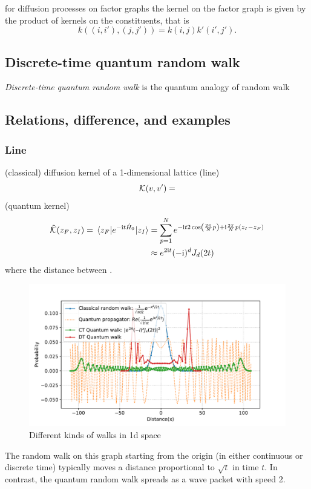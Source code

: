 \begin{remark}
	for diﬀusion processes on factor graphs the kernel on the factor graph is given by the product of kernels on the constituents, that is 
	\begin{equation}
		k((i, i'), (j, j')) = k(i, j) k' (i' , j' ).
	\end{equation}
\end{remark}

\subsection{Discrete-time quantum random walk}
\emph{Discrete-time quantum random walk} is the quantum analogy of random walk

\subsection{Relations, difference, and examples}
\subsubsection{Line}
(classical) diffusion kernel of a 1-dimensional lattice (line)
\begin{equation}
	\mathcal{K}(v,v') = 
\end{equation}
 (quantum kernel)
\begin{align}
	\tilde{\mathcal{K}}(z_F,z_I) = 
	\mel{z_F}{e^{-\textup{i}t\hat{H}_0 }}{z_I}
	&=\sum_{p=1}^{N} 
	e^{-\textup{i} t 2\cos(\frac{2\pi}{N}p) +\textup{i} \frac{2\pi}{N} p(z_I-z_F)} 
	\\
	&
	\approx e^{2\textup{i} t} (-\textup{i})^{d} J_{d} (2t)
	\label{eq:ctqrw_kernel}
\end{align}
where the distance between .
\begin{figure}[!ht]
	\centering
	\includegraphics[width=.7\linewidth]{walk_propagator_1d.pdf}
	\caption{Different kinds of walks in 1d space}
\end{figure}
\begin{remark}
    The random walk on this graph starting from the origin (in either continuous or discrete time)
    typically moves a distance proportional to $\sqrt{t}$ in time $t$.
	In contrast, the quantum random walk spreads as a wave packet with speed 2.
\end{remark}

